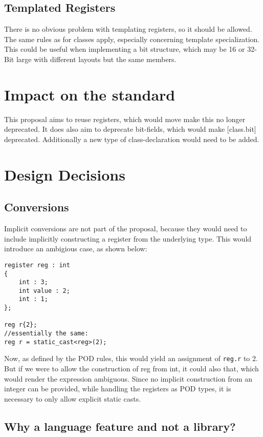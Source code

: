 \documentclass{report}
\begin{document}
\section{Templated Registers}
There is no obvious problem with templating registers, so it should be allowed.
The same rules as for classes apply, especially concerning template specialization.
This could be useful when implementing a bit structure, which may be 16 or 32-Bit large with different layouts but the same members.

\chapter{Impact on the standard}
This proposal aims to reuse registers, which would move make this no longer
deprecated. It does also aim to deprecate bit-fields, which would make
[class.bit] deprecated.
Additionally a new type of class-declaration would need to be added.

\chapter{Design Decisions}
\section{Conversions}
Implicit conversions are not part of the proposal, because they would need to include implicitly constructing a register from the underlying type. This would introduce an ambigious case, as shown below:

\begin{lstlisting}
register reg : int
{
	int : 3;
	int value : 2;
	int : 1;
};

reg r{2};
//essentially the same:
reg r = static_cast<reg>(2);
\end{lstlisting}

Now, as defined by the POD rules, this would yield an assignment of \lstinline  {reg.r} to 2. But if we were to allow the construction of reg from int, it could
also that, which would render the expression ambiguous.
Since no implicit construction from an integer can be provided, while handling the registers as POD types, it is necessary to only allow explicit static casts.

\section{Why a language feature and not a library?}
\end{document}
